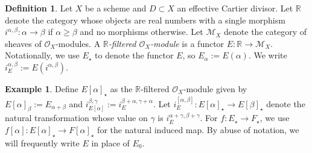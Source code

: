 \documentclass[12 pt]{amsart}
\theoremstyle{plain}
\theoremstyle{definition}
\newtheorem{definition}[subsubsection]{Definition}
\newtheorem{example}[subsubsection]{Example}
\theoremstyle{remark}
\numberwithin{equation}{section}
\begin{document}
\begin{definition}
	\label{definition:filtered-O_X-module}
	Let $X$ be a scheme and $D \subset X$ an effective Cartier divisor.
	Let $\mathbb R$ denote the category whose objects are real numbers with
	a single morphism $i^{\alpha,\beta}:\alpha\to\beta$ if $\alpha \geq \beta$ and no
	morphisms otherwise.
	Let $\mathscr M_X$ denote the category of sheaves of $\mathscr{O}_X$-modules.
A {\em $\mathbb R$-filtered $\mathscr O_X$-module} is a functor $E: \mathbb R \to \mathscr M_X$.
Notationally, we use $E_\star$ to denote the functor $E$, so $E_\alpha := E(\alpha)$.
We write $i_E^{\alpha,\beta} := E(i^{\alpha,\beta})$.
\end{definition}
\begin{example}
	\label{example:}
	Define $E[\alpha]_\star$ as the $\mathbb{R}$-filtered $\mathscr O_X$-module given by
$E[\alpha]_\beta := E_{\alpha + \beta}$
and $i^{\beta,\gamma}_{E[\alpha]} := i_E^{\beta + \alpha, \gamma + \alpha}$.
Let $i^{[\alpha,\beta]}_E : E[\alpha]_\star \to E[\beta]_\star$ denote the
natural transformation whose value on $\gamma$ is $i_E^{\alpha + \gamma, \beta +
\gamma}$.
For $f: E_\star \to F_\star$, we use $f[\alpha] : E[\alpha]_\star \to F[\alpha]_\star$ for
the natural induced map.
By abuse of notation, we will frequently write $E$ in place of $E_0$.
\end{example}
\end{document}
